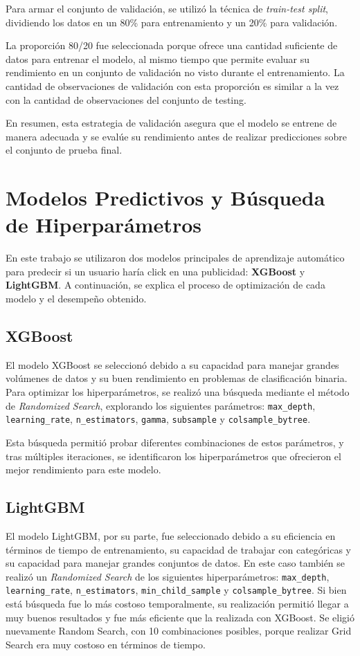 \documentclass[a4paper,12pt]{article}
\begin{document}
Para armar el conjunto de validación, se utilizó la técnica de \textit{train-test split}, dividiendo los datos en un 80\% para entrenamiento y un 20\% para validación.

La proporción 80/20 fue seleccionada porque ofrece una cantidad suficiente de datos para entrenar el modelo, al mismo tiempo que permite evaluar su rendimiento en un conjunto de validación no visto durante el entrenamiento. La cantidad de observaciones de validación con esta proporción es similar a la vez con la cantidad de observaciones del conjunto de testing.

En resumen, esta estrategia de validación asegura que el modelo se entrene de manera adecuada y se evalúe su rendimiento antes de realizar predicciones sobre el conjunto de prueba final.


\section{Modelos Predictivos y Búsqueda de Hiperparámetros}

En este trabajo se utilizaron dos modelos principales de aprendizaje automático para predecir si un usuario haría click en una publicidad: \textbf{XGBoost} y \textbf{LightGBM}. A continuación, se explica el proceso de optimización de cada modelo y el desempeño obtenido.

\subsection{XGBoost}

El modelo XGBoost se seleccionó debido a su capacidad para manejar grandes volúmenes de datos y su buen rendimiento en problemas de clasificación binaria. Para optimizar los hiperparámetros, se realizó una búsqueda mediante el método de \textit{Randomized Search}, explorando los siguientes parámetros: \texttt{max\_depth}, \texttt{learning\_rate}, \texttt{n\_estimators}, \texttt{gamma}, \texttt{subsample} y \texttt{colsample\_bytree}.

Esta búsqueda permitió probar diferentes combinaciones de estos parámetros, y tras múltiples iteraciones, se identificaron los hiperparámetros que ofrecieron el mejor rendimiento para este modelo.

\subsection{LightGBM}

El modelo LightGBM, por su parte, fue seleccionado debido a su eficiencia en términos de tiempo de entrenamiento, su capacidad de trabajar con categóricas y su capacidad para manejar grandes conjuntos de datos. En este caso también se realizó un \textit{Randomized Search} de los siguientes hiperparámetros: \texttt{max\_depth}, \texttt{learning\_rate}, \texttt{n\_estimators}, \texttt{min\_child\_sample} y \texttt{colsample\_bytree}. Si bien está búsqueda fue lo más costoso temporalmente, su realización permitió llegar a muy buenos resultados y fue más eficiente que la realizada con XGBoost. Se eligió nuevamente Random Search, con 10 combinaciones posibles, porque realizar Grid Search era muy costoso en términos de tiempo.
\end{document}
